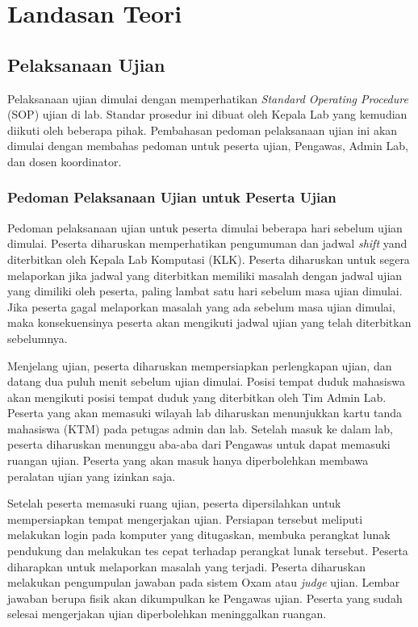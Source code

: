 \chapter{Landasan Teori}
\label{chap:teori}

\section{Pelaksanaan Ujian}
    Pelaksanaan ujian dimulai dengan memperhatikan \textit{Standard Operating Procedure} 
    (SOP) ujian
    di lab\cite{lab:buku-sop}. Standar prosedur ini dibuat oleh Kepala Lab yang
    kemudian diikuti oleh beberapa pihak. Pembahasan pedoman pelaksanaan ujian
    ini akan dimulai dengan membahas pedoman untuk peserta ujian, Pengawas,
    Admin Lab, dan dosen koordinator.
    
\subsection{Pedoman Pelaksanaan Ujian untuk Peserta Ujian}
    Pedoman pelaksanaan ujian untuk peserta dimulai beberapa hari sebelum ujian
    dimulai. Peserta diharuskan memperhatikan pengumuman dan jadwal
    \textit{shift} yand diterbitkan oleh Kepala Lab Komputasi (KLK). Peserta
    diharuskan untuk segera melaporkan jika jadwal yang diterbitkan memiliki
    masalah dengan jadwal ujian yang dimiliki oleh peserta, paling lambat satu
    hari sebelum masa ujian dimulai. Jika peserta gagal melaporkan masalah yang
    ada sebelum masa ujian dimulai, maka konsekuensinya peserta akan mengikuti
    jadwal ujian yang telah diterbitkan sebelumnya.

    Menjelang ujian, peserta diharuskan mempersiapkan perlengkapan ujian, dan
    datang dua puluh menit sebelum ujian dimulai. Posisi tempat duduk mahasiswa
    akan mengikuti posisi tempat duduk yang diterbitkan oleh Tim Admin Lab.
    Peserta yang akan memasuki wilayah lab diharuskan menunjukkan kartu tanda
    mahasiswa (KTM) pada petugas admin dan lab. Setelah masuk ke dalam lab,
    peserta diharuskan menunggu aba-aba dari Pengawas untuk dapat memasuki
    ruangan ujian. Peserta yang akan masuk hanya diperbolehkan membawa peralatan
    ujian yang izinkan saja.

    Setelah peserta memasuki ruang ujian, peserta dipersilahkan untuk mempersiapkan
    tempat mengerjakan ujian. Persiapan tersebut meliputi melakukan login pada
    komputer yang ditugaskan, membuka perangkat lunak pendukung dan melakukan tes
    cepat terhadap perangkat lunak tersebut. Peserta diharapkan untuk melaporkan
    masalah yang terjadi. Peserta diharuskan melakukan pengumpulan jawaban pada
    sistem Oxam atau \textit{judge} ujian. Lembar jawaban berupa fisik akan
    dikumpulkan ke Pengawas ujian. Peserta yang sudah selesai mengerjakan ujian
    diperbolehkan meninggalkan ruangan.

